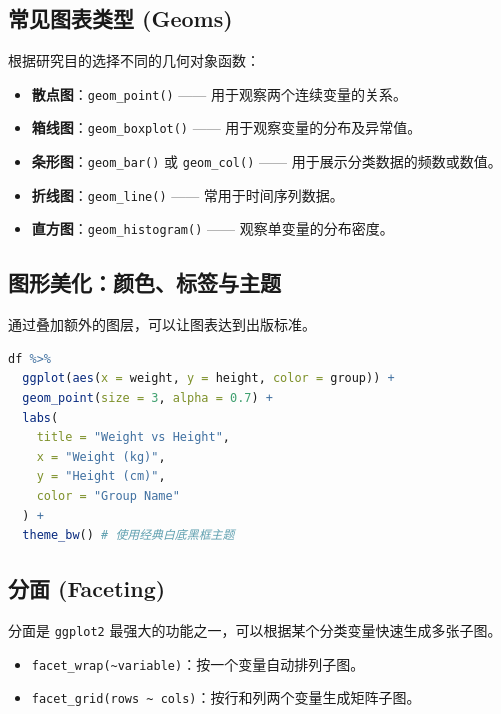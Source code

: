 \subsection{常见图表类型 (Geoms)}
根据研究目的选择不同的几何对象函数：

\begin{itemize}
    \item \textbf{散点图}：\texttt{geom\_point()} —— 用于观察两个连续变量的关系。
    \item \textbf{箱线图}：\texttt{geom\_boxplot()} —— 用于观察变量的分布及异常值。
    \item \textbf{条形图}：\texttt{geom\_bar()} 或 \texttt{geom\_col()} —— 用于展示分类数据的频数或数值。
    \item \textbf{折线图}：\texttt{geom\_line()} —— 常用于时间序列数据。
    \item \textbf{直方图}：\texttt{geom\_histogram()} —— 观察单变量的分布密度。
\end{itemize}

\subsection{图形美化：颜色、标签与主题}
通过叠加额外的图层，可以让图表达到出版标准。
\begin{lstlisting}[language=R]
df %>%
  ggplot(aes(x = weight, y = height, color = group)) +
  geom_point(size = 3, alpha = 0.7) +
  labs(
    title = "Weight vs Height",
    x = "Weight (kg)",
    y = "Height (cm)",
    color = "Group Name"
  ) +
  theme_bw() # 使用经典白底黑框主题
\end{lstlisting}

\subsection{分面 (Faceting)}
分面是 \texttt{ggplot2} 最强大的功能之一，可以根据某个分类变量快速生成多张子图。
\begin{itemize}
    \item \texttt{facet\_wrap(\~{}variable)}：按一个变量自动排列子图。
    \item \texttt{facet\_grid(rows \~{} cols)}：按行和列两个变量生成矩阵子图。
\end{itemize}



